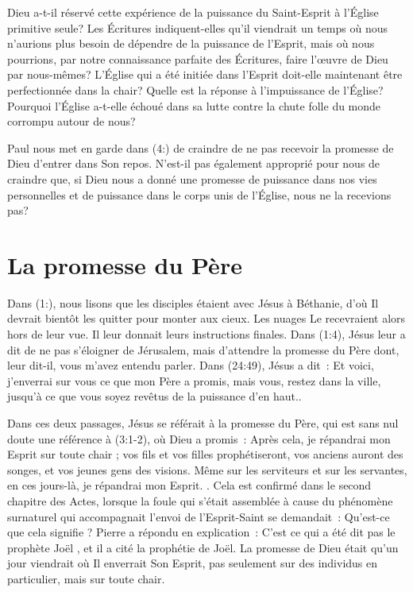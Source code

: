 Dieu a-t-il réservé cette expérience de la puissance du Saint-Esprit à l'Église primitive seule? Les Écritures indiquent-elles qu'il viendrait un temps où nous n'aurions plus besoin de dépendre de la puissance de l'Esprit, mais où nous pourrions, par notre connaissance parfaite des Écritures, faire l'œuvre de Dieu par nous-mêmes? L'Église qui a été initiée dans l'Esprit doit-elle maintenant être perfectionnée dans la chair? Quelle est la réponse à l'impuissance de l'Église? Pourquoi l'Église a-t-elle échoué dans sa lutte contre la chute folle du monde corrompu autour de nous?

Paul nous met en garde dans (4:) de craindre de ne pas recevoir la promesse de Dieu d'entrer dans Son repos. N'est-il pas également approprié pour nous de craindre que, si Dieu nous a donné une promesse de puissance dans nos vies personnelles et de puissance dans le corps unis de l'Église, nous ne la recevions pas?


\section*{La promesse du Père}

Dans (1:), nous lisons que les disciples étaient avec Jésus à Béthanie, d'où Il devrait bientôt les quitter pour monter aux cieux. Les nuages Le recevraient alors hors de leur vue. Il leur donnait leurs instructions finales. Dans (1:4), Jésus leur a dit de \og ne pas s'éloigner de Jérusalem, mais d'attendre la promesse du Père dont, leur dit-il, vous m'avez entendu parler. \fg{} Dans (24:49), Jésus a dit~: \og Et voici, j'enverrai sur vous ce que mon Père a promis, mais vous, restez dans la ville, jusqu'à ce que vous soyez revêtus de la puissance d'en haut.\fg{}.

Dans ces deux passages, Jésus se référait à la promesse du Père, qui est sans nul doute une référence à (3:1-2), où Dieu a promis~: 
\og Après cela, je répandrai mon Esprit sur toute chair ;
vos fils et vos filles prophétiseront,
vos anciens auront des songes,
et vos jeunes gens des visions.
Même sur les serviteurs et sur les servantes,
en ces jours-là, je répandrai mon Esprit. \fg{}.
Cela est confirmé dans le second chapitre des Actes, lorsque la foule qui s'était assemblée à cause du phénomène surnaturel qui accompagnait l'envoi de l'Esprit-Saint se demandait~: \og Qu'est-ce que cela signifie ? \fg{} Pierre a répondu en explication~: \og C'est ce qui a été dit pas le prophète Joël \fg{}, et il a cité la prophétie de Joël. La promesse de Dieu était qu'un jour viendrait où Il enverrait Son Esprit, pas seulement sur des individus en particulier, mais sur toute chair.

